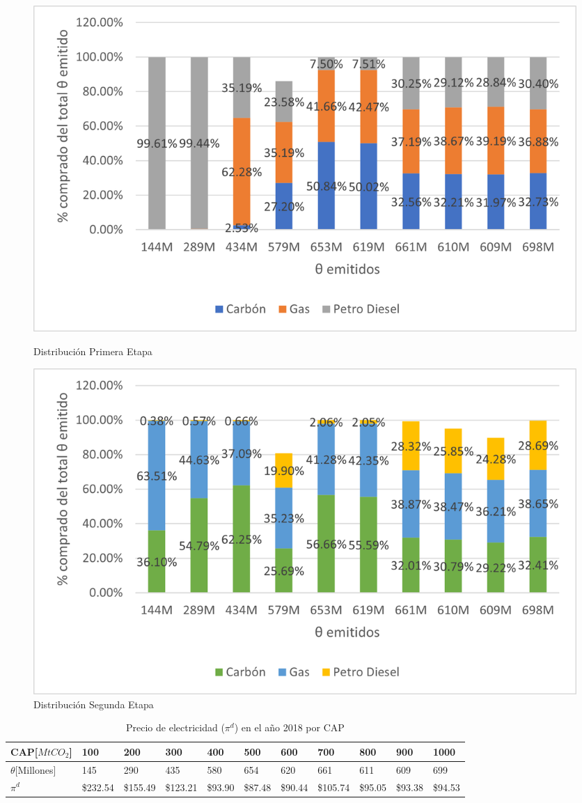\begin{figure}[H]
  \centering
  \begin{minipage}[b]{0.49\textwidth}
    \includegraphics[width=\textwidth]{docs/DocumentoMemoria/core/images/distr primera etapa tasa cuadrada.png}
    \caption{{\footnotesize Distribución Primera Etapa}}
  \end{minipage}
  \hfill
  \begin{minipage}[b]{0.49\textwidth}
    \includegraphics[width=\textwidth]{docs/DocumentoMemoria/core/images/distr segunda etapa tasa cuadrada.png}
    \caption{{\footnotesize Distribución Segunda Etapa}}
  \end{minipage}
\end{figure}

\begin{table}[H]
\begin{footnotesize}
    \centering
    \begin{tabular}{|l|l|l|l|l|l|l|l|l|l|l|}
    \hline
        CAP[$MtCO_2$] & 100 & 200 & 300 & 400 & 500 & 600 & 700 & 800 & 900 & 1000 \\ \hline
       $\theta$[Millones]  & 145  & 290  & 435  & 580  & 654  & 620  & 661  & 611  & 609  & 699  \\ \hline
        $\pi^d$  &  \$232.54   &  \$155.49   &  \$123.21   &  \$93.90   &  \$87.48   &  \$90.44   &  \$105.74   &  \$95.05   &  \$93.38   &  \$94.53   \\ \hline
    \end{tabular}
    \caption{{\footnotesize Precio de electricidad ($\pi^d$) en el año 2018 por CAP }}
    \label{TCpidporcap}
\end{footnotesize}
\end{table}


